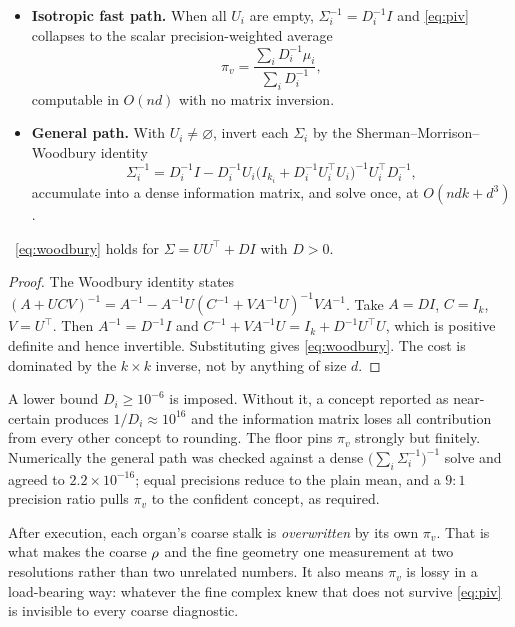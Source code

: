 \begin{itemize}
  \item \textbf{Isotropic fast path.} When all $U_i$ are empty,
  $\Sigma_i^{-1}=D_i^{-1}I$ and \eqref{eq:piv} collapses to the scalar
  precision-weighted average
  \begin{equation}\label{eq:isopath}
    \pi_v=\frac{\sum_i D_i^{-1}\mu_i}{\sum_i D_i^{-1}},
  \end{equation}
  computable in $O(nd)$ with no matrix inversion.

  \item \textbf{General path.} With $U_i\neq\varnothing$, invert each
  $\Sigma_i$ by the Sherman--Morrison--Woodbury identity
  \begin{equation}\label{eq:woodbury}
    \Sigma_i^{-1}=D_i^{-1}I
    -D_i^{-1}U_i\bigl(I_{k_i}+D_i^{-1}U_i^\top U_i\bigr)^{-1}U_i^\top D_i^{-1},
  \end{equation}
  accumulate into a dense information matrix, and solve once, at
  $O(ndk+d^3)$.
\end{itemize}

\begin{lemma}\label{lem:woodbury}
\Proved\ \eqref{eq:woodbury} holds for $\Sigma=UU^\top+DI$ with $D>0$.
\end{lemma}
\begin{proof}
The Woodbury identity states
$(A+UCV)^{-1}=A^{-1}-A^{-1}U(C^{-1}+VA^{-1}U)^{-1}VA^{-1}$. Take
$A=DI$, $C=I_k$, $V=U^\top$. Then $A^{-1}=D^{-1}I$ and
$C^{-1}+VA^{-1}U=I_k+D^{-1}U^\top U$, which is positive definite and
hence invertible. Substituting gives \eqref{eq:woodbury}. The cost is
dominated by the $k\times k$ inverse, not by anything of size $d$.
\end{proof}

\begin{remark}
A lower bound $D_i\ge10^{-6}$ is imposed. Without it, a concept reported
as near-certain produces $1/D_i\approx10^{16}$ and the information
matrix loses all contribution from every other concept to rounding. The
floor pins $\pi_v$ strongly but finitely. Numerically the general path
was checked against a dense $\bigl(\sum_i\Sigma_i^{-1}\bigr)^{-1}$ solve
and agreed to $2.2\times10^{-16}$; equal precisions reduce to the plain
mean, and a $9{:}1$ precision ratio pulls $\pi_v$ to the confident
concept, as required.
\end{remark}

\begin{remark}\label{rem:glue}
After execution, each organ's coarse stalk is \emph{overwritten} by its
own $\pi_v$. That is what makes the coarse $\rho$ and the fine
geometry one measurement at two resolutions rather than two unrelated
numbers. It also means $\pi_v$ is lossy in a load-bearing way: whatever
the fine complex knew that does not survive \eqref{eq:piv} is invisible
to every coarse diagnostic.
\end{remark}

